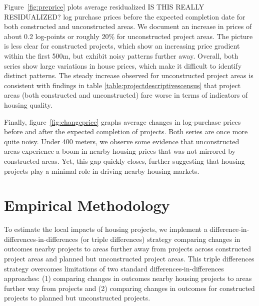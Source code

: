 \documentclass[12pt]{article}
\begin{document}
Figure~\ref{fig:preprice} plots average residualized  IS THIS REALLY RESIDUALIZED? log purchase prices before the expected completion date for both constructed and unconstructed areas. We document an increase in prices of about 0.2 log-points or roughly 20\% for unconstructed project areas. The picture is less clear for constructed projects, which show an increasing price gradient within the first 500m, but exhibit noisy patterns further away.  Overall, both series show large variations in house prices, which make it difficult to identify  distinct patterns. The steady increase observed for unconstructed project areas is consistent with findings in table \ref{table:projectdescriptivescensus} that project areas (both constructed and unconstructed) fare worse in terms of indicators of housing quality.

Finally, figure~\ref{fig:changeprice} graphs average changes in log-purchase prices before and after the expected completion of projects. Both series are once more quite noisy. Under 400 meters, we observe some evidence that unconstructed areas experience a boom in nearby housing prices that was not mirrored by constructed areas.  Yet, this gap quickly closes, further suggesting that housing projects play a minimal role in driving nearby housing markets.




\section{Empirical Methodology}\label{section:methodology}


To estimate the local impacts of housing projects, we implement a difference-in-differences-in-differences (or triple differences) strategy comparing changes in outcomes nearby projects to areas further away from projects across constructed project areas and planned but unconstructed project areas.  This triple differences strategy overcomes limitations of two standard differences-in-differences approaches: (1) comparing changes in outcomes nearby housing projects to areas further way from projects and (2) comparing changes in outcomes for constructed projects to planned but unconstructed projects.
\end{document}
